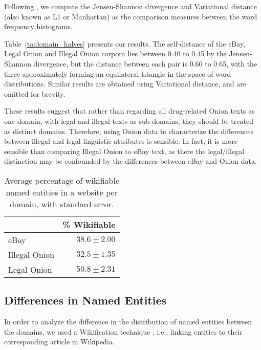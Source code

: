 \documentclass[11pt,a4paper,table]{article}
\newcommand{\oa}[1]{\footnote{\color{red}OA: #1}}
\begin{document}
    Following \citet{Plank2011EffectiveMO}, we compute the Jensen-Shannon divergence and Variational distance (also known as L1 or Manhattan) as the comparison measures between the word frequency histograms.
    
    Table~\ref{ta:domain_halves} presents our results.
    The self-distance of the eBay, Legal Onion and Illegal Onion corpora lies between 0.40 to 0.45
    by the Jensen-Shannon divergence, but the distance between each pair is 0.60 to 0.65, with the three approximately forming an equilateral triangle
    in the space of word distributions.
    Similar results are obtained using Variational distance, and are omitted for brevity.

    These results suggest that rather than regarding all drug-related Onion texts as one domain, with legal and illegal texts as sub-domains, 
      they should be treated as distinct domains.
    Therefore, using Onion data to characterize the differences between illegal and legal linguistic attributes is sensible. 
    In fact, it is more sensible than comparing Illegal Onion to eBay text, as there the legal/illegal distinction may be confounded by the differences
      between eBay and Onion data.

\begin{table}
\begin{center}
\begin{tabular}{l|r}
 & \% Wikifiable\\
 \hline
eBay & $38.6 \pm2.00$\\
Illegal Onion & $32.5 \pm1.35$\\
Legal Onion & $50.8 \pm2.31$
\end{tabular}
\end{center}
\caption{Average percentage of wikifiable named entities in a website per domain, with standard error.\label{ta:wiki}}
\end{table}


\subsection{Differences in Named Entities}\label{sec:ner}

    In order to analyze the difference in the distribution of 
    named entities between the domains,  we used a Wikification technique \cite{bunescu2006using}, i.e., linking entities to their corresponding article in Wikipedia.
\end{document}
